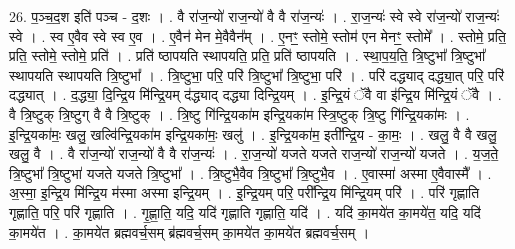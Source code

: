\documentclass[17pt]{extarticle}
\begin{document}
26. प॒ञ्च॒द॒श इति॑ पञ्च - द॒शः । . वै रा॑ज॒न्यो॑ राज॒न्यो॑ वै वै रा॑ज॒न्यः॑ । . रा॒ज॒न्यः॑ स्वे स्वे रा॑ज॒न्यो॑ राज॒न्यः॑ स्वे । . स्व ए॒वैव स्वे स्व ए॒व । . ए॒वैन॑ मेन मे॒वैवैन᳚म् । . ए॒नꣳ॒॒ स्तोमे॒ स्तोम॑ एन मेनꣳ॒॒ स्तोमे᳚ । . स्तोमे॒ प्रति॒ प्रति॒ स्तोमे॒ स्तोमे॒ प्रति॑ । . प्रति॑ ष्ठापयति स्थापयति॒ प्रति॒ प्रति॑ ष्ठापयति । . स्था॒प॒य॒ति॒ त्रि॒ष्टुभा᳚ त्रि॒ष्टुभा᳚ स्थापयति स्थापयति त्रि॒ष्टुभा᳚ । . त्रि॒ष्टुभा॒ परि॒ परि॑ त्रि॒ष्टुभा᳚ त्रि॒ष्टुभा॒ परि॑ । . परि॑ दद्ध्याद् दद्ध्या॒त् परि॒ परि॑ दद्ध्यात् । . द॒द्ध्या॒ दि॒न्द्रि॒य मि॑न्द्रि॒यम् द॑द्ध्याद् दद्ध्या दिन्द्रि॒यम् । . इ॒न्द्रि॒यं ॅवै वा इ॑न्द्रि॒य मि॑न्द्रि॒यं ॅवै । . वै त्रि॒ष्टुक् त्रि॒ष्टुग् वै वै त्रि॒ष्टुक् । . त्रि॒ष्टु गि॑न्द्रि॒यका॑म इन्द्रि॒यका॑म स्त्रि॒ष्टुक् त्रि॒ष्टु गि॑न्द्रि॒यका॑मः । . इ॒न्द्रि॒यका॑मः॒ खलु॒ खल्वि॑न्द्रि॒यका॑म इन्द्रि॒यका॑मः॒ खलु॑ । . इ॒न्द्रि॒यका॑म॒ इती᳚न्द्रि॒य - का॒मः॒ । . खलु॒ वै वै खलु॒ खलु॒ वै । . वै रा॑ज॒न्यो॑ राज॒न्यो॑ वै वै रा॑ज॒न्यः॑ । . रा॒ज॒न्यो॑ यजते यजते राज॒न्यो॑ राज॒न्यो॑ यजते । . य॒ज॒ते॒ त्रि॒ष्टुभा᳚ त्रि॒ष्टुभा॑ यजते यजते त्रि॒ष्टुभा᳚ । . त्रि॒ष्टुभै॒वैव त्रि॒ष्टुभा᳚ त्रि॒ष्टुभै॒व । . ए॒वास्मा॑ अस्मा ए॒वैवास्मै᳚ । . अ॒स्मा॒ इ॒न्द्रि॒य मि॑न्द्रि॒य म॑स्मा अस्मा इन्द्रि॒यम् । . इ॒न्द्रि॒यम् परि॒ परी᳚न्द्रि॒य मि॑न्द्रि॒यम् परि॑ । . परि॑ गृह्णाति गृह्णाति॒ परि॒ परि॑ गृह्णाति । . गृ॒ह्णा॒ति॒ यदि॒ यदि॑ गृह्णाति गृह्णाति॒ यदि॑ । . यदि॑ का॒मये॑त का॒मये॑त॒ यदि॒ यदि॑ का॒मये॑त । . का॒मये॑त ब्रह्मवर्च॒सम् ब्र॑ह्मवर्च॒सम् का॒मये॑त का॒मये॑त ब्रह्मवर्च॒सम् । \newline
\end{document}
